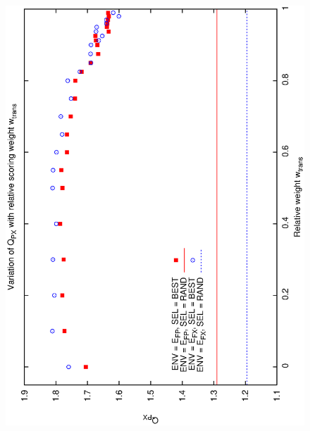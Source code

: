 \begin{figure}[h]
\begin{center}
{    \includegraphics[scale=0.25, angle=-90]{figures/cs1_dw1a2_px.eps}
    \label{fig:cs1_dw1a2_px}
  }
\end{center}
\end{figure}
